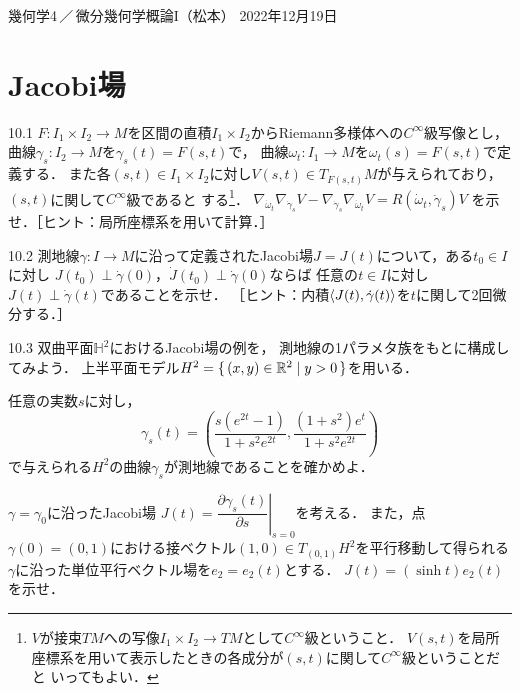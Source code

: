 \documentclass[uplatex,dvipdfmx,fontsize=12pt,jafontsize=11pt,line_length=42zw,number_of_lines=36,hanging_punctuation]{jlreq}
\begin{document}
\begin{flushleft}
	幾何学4\,／\,微分幾何学概論I（松本）
	\hfill
	2022年12月19日
\end{flushleft}
\setcounter{section}{9}
\section{Jacobi場}

\begin{enumerate-problems}
	\item[10.1]
		$F\colon I_1\times I_2\to M$を区間の直積$I_1\times I_2$からRiemann多様体への$C^\infty$級写像とし，
		曲線$\gamma_s\colon I_2\to M$を$\gamma_s(t)=F(s,t)$で，
		曲線$\omega_t\colon I_1\to M$を$\omega_t(s)=F(s,t)$で定義する．
		また各$(s,t)\in I_1\times I_2$に対し$V(s,t)\in T_{F(s,t)}M$が与えられており，
		$(s,t)$に関して$C^\infty$級であると
		する\footnote{$V$が接束$TM$への写像$I_1\times I_2\to TM$として$C^\infty$級ということ．
		$V(s,t)$を局所座標系を用いて表示したときの各成分が$(s,t)$に関して$C^\infty$級ということだと
		いってもよい．}．
		$\nabla_{\dot{\omega}_t}\nabla_{\dot{\gamma}_s}V-\nabla_{\dot{\gamma}_s}\nabla_{\dot{\omega}_t}V
		=R(\dot{\omega}_t,\dot{\gamma}_s)V$
		を示せ．［ヒント：局所座標系を用いて計算．］
	\item[10.2]
		測地線$\gamma\colon I\to M$に沿って定義されたJacobi場$J=J(t)$について，ある$t_0\in I$に対し
		$J(t_0)\perp\dot{\gamma}(0)$，$\dot{J}(t_0)\perp\dot{\gamma}(0)$ならば
		任意の$t\in I$に対し$J(t)\perp\dot{\gamma}(t)$であることを示せ．
		［ヒント：内積$\braket{J(t),\dot{\gamma}(t)}$を$t$に関して2回微分する．］
	\item[10.3]
		双曲平面$\mathbb{H}^2$におけるJacobi場の例を，
		測地線の1パラメタ族をもとに構成してみよう．
		上半平面モデル$H^2=\set{(x,y)\in\mathbb{R}^2|y>0}$を用いる．
		\begin{enumerate-subproblems}
			\item
				任意の実数$s$に対し，
				\begin{equation}
					\gamma_s(t)=\left(\frac{s(e^{2t}-1)}{1+s^2e^{2t}},\frac{(1+s^2)e^t}{1+s^2e^{2t}}\right)
				\end{equation}
				で与えられる$H^2$の曲線$\gamma_s$が測地線であることを確かめよ．
			\item
				$\gamma=\gamma_0$に沿ったJacobi場
				$J(t)=\left.\dfrac{\partial \gamma_s(t)}{\partial s}\right|_{s=0}$を考える．
				また，点$\gamma(0)=(0,1)$における接ベクトル$(1,0)\in T_{(0,1)}H^2$を平行移動して得られる
				$\gamma$に沿った単位平行ベクトル場を$e_2=e_2(t)$とする．
				$J(t)=(\sinh t)e_2(t)$を示せ．

\end{enumerate-subproblems}
\end{enumerate-problems}
\end{document}

